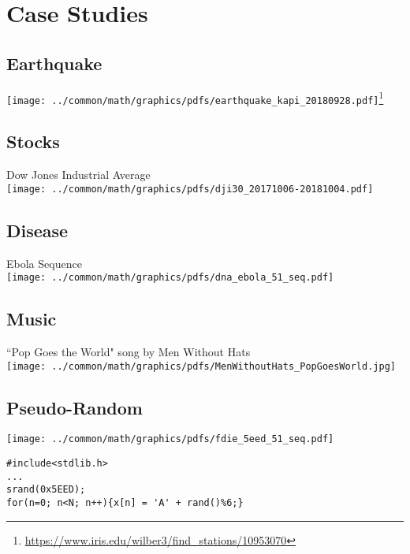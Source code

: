 \chapter{Case Studies}


\section{Earthquake}
\texttt{[image: ../common/math/graphics/pdfs/earthquake\_kapi\_20180928.pdf]}\footnote{\url{https://www.iris.edu/wilber3/find_stations/10953070}}

\section{Stocks}
Dow Jones Industrial Average
\\\texttt{[image: ../common/math/graphics/pdfs/dji30\_20171006-20181004.pdf]}

\section{Disease}
  Ebola Sequence
\\\texttt{[image: ../common/math/graphics/pdfs/dna\_ebola\_51\_seq.pdf]}

\section{Music}
``Pop Goes the World" song by Men Without Hats
\\\texttt{[image: ../common/math/graphics/pdfs/MenWithoutHats\_PopGoesWorld.jpg]}

\section{Pseudo-Random}
\texttt{[image: ../common/math/graphics/pdfs/fdie\_5eed\_51\_seq.pdf]}

\begin{lstlisting}
#include<stdlib.h>
...
srand(0x5EED);
for(n=0; n<N; n++){x[n] = 'A' + rand()%6;}
\end{lstlisting}

